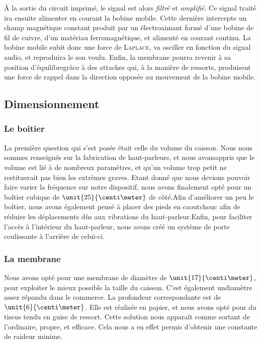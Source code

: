 \documentclass{article}
\begin{document}
\begin{itemize}
\begin{itemize}
À la sortie du circuit imprimé, le signal est alors \textit{filtré} et \textit{amplifié}.
Ce signal traité ira ensuite alimenter en courant la bobine mobile. Cette dernière intercepte un champ magnétique constant 
produit par un électroaimant formé d'une bobine de fil de cuivre, d'un matériau ferromagnétique, et alimenté en courant continu.
La bobine mobile subit donc une force de \textsc{Laplace}, va osciller en fonction du  signal audio, et reproduira le son voulu.
Enfin, la membrane pourra revenir à sa position d'équilibregrâce à des attaches qui, à la manière de ressorts, produisent une
force de rappel dans la direction opposée au mouvement de la bobine mobile. 

\subsection{Dimensionnement}
\subsubsection{Le boîtier}
La première question qui s'est posée était celle du volume du caisson. Nous nous sommes renseignés sur la fabrication de 
haut-parleurs, et nous avonsappris que le volume est lié à de nombreux paramètres, et qu'un volume trop petit ne restituerait 
pas bien les extrèmes graves. Etant donné que nous devions pouvoir faire varier la fréquence sur notre dispositif, nous avons 
finalement opté pour un boîtier cubique de $\unit{25}{\centi\meter}$ de côté.Afin d'améliorer un peu le boîtier, nous avons
également pensé à placer des pieds en caoutchouc afin de réduire les déplacements dûs aux vibrations du haut-parleur.Enfin,
pour faciliter l'accès à l'intérieur du haut-parleur, nous avons créé un système de porte coulissante à l'arrière de celui-ci.

\subsubsection{La membrane}
Nous avons opté pour une membrane de diamètre de $\unit{17}{\centi\meter}$, pour exploiter le mieux possible la taille du
caisson. C'est également undiamètre assez répandu dans le commerce. La profondeur correspondante est de $\unit{6}{\centi\meter}$.
Elle est réalisée en papier, et nous avons opté pour du tissus tendu en guise de ressort. Cette solution nous apparaît comme
sortant de l'ordinaire, propre, et efficace. Cela nous a en effet permis d'obtenir une constante de raideur minime.


\end{itemize}
\end{itemize}
\end{document}
